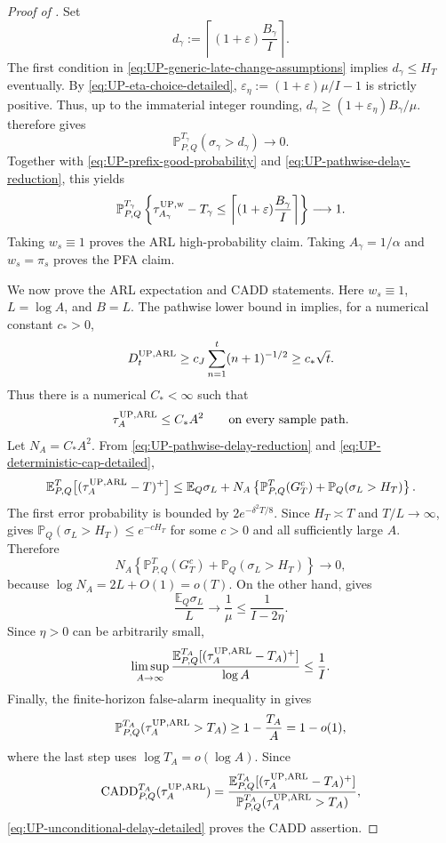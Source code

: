 \documentclass[12pt]{article}
\theoremstyle{spaced}
\theoremstyle{remark}
\newcommand{\E}{\mathbb E}
\newcommand{\bbP}{\mathbb P}
\newcommand{\CADD}{\mathrm{CADD}}
\begin{document}
\begin{proof}[Proof of ]
Set
\[
 d_\gamma
 :=\left\lceil(1+\varepsilon)\frac{B_\gamma}{I}\right\rceil.
\]
The first condition in
\eqref{eq:UP-generic-late-change-assumptions} implies
$d_\gamma\le H_T$ eventually.  By \eqref{eq:UP-eta-choice-detailed},
$\varepsilon_\eta:=(1+\varepsilon)\mu/I-1$ is strictly positive.
Thus, up to the immaterial integer rounding,
$d_\gamma\ge(1+\varepsilon_\eta)B_\gamma/\mu$.
 therefore gives
\[
 \bbP_{P,Q}^{T_\gamma}(\sigma_\gamma>d_\gamma)\to0.
\]
Together with \eqref{eq:UP-prefix-good-probability} and
\eqref{eq:UP-pathwise-delay-reduction}, this yields
\begin{equation}
\label{eq:UP-generic-high-probability-delay}
 \bbP_{P,Q}^{T_\gamma}
 \left\{
   \tau_{A_\gamma}^{\rm UP,w}-T_\gamma
   \le
   \left\lceil(1+\varepsilon)\frac{B_\gamma}{I}\right\rceil
 \right\}
 \longrightarrow1.
\end{equation}
Taking $w_s\equiv1$ proves the ARL high-probability claim.  Taking
$A_\gamma=1/\alpha$ and $w_s=\pi_s$ proves the PFA claim.

We now prove the ARL expectation and CADD statements.  Here $w_s\equiv1$,
$L=\log A$, and $B=L$.  The pathwise lower bound in
 implies, for a numerical constant $c_*>0$,
\[
 D_t^{\rm UP,ARL}
 \ge c_J\sum_{n=1}^t(n+1)^{-1/2}
 \ge c_*\sqrt t.
\]
Thus there is a numerical $C_*<\infty$ such that
\begin{equation}
\label{eq:UP-deterministic-cap-detailed}
 \tau_A^{\rm UP,ARL}\le C_*A^2
 \qquad\text{on every sample path.}
\end{equation}
Let $N_A=C_*A^2$.  From
\eqref{eq:UP-pathwise-delay-reduction} and
\eqref{eq:UP-deterministic-cap-detailed},
\begin{equation}
\label{eq:UP-expectation-decomposition-detailed}
 \E_{P,Q}^{T}\big[(\tau_A^{\rm UP,ARL}-T)^+\big]
 \le
 \E_Q\sigma_L
 +N_A\left\{
   \bbP_{P,Q}^{T}(G_T^c)+\bbP_Q(\sigma_L>H_T)
 \right\}.
\end{equation}
The first error probability is bounded by
$2e^{-\delta^2T/8}$.  Since $H_T\asymp T$ and $T/L\to\infty$,
 gives
$\bbP_Q(\sigma_L>H_T)\le e^{-cH_T}$ for some $c>0$ and all sufficiently
large $A$.  Therefore
\[
 N_A\left\{
   \bbP_{P,Q}^{T}(G_T^c)+\bbP_Q(\sigma_L>H_T)
 \right\}
 \longrightarrow0,
\]
because $\log N_A=2L+O(1)=o(T)$.  On the other hand,
 gives
\[
 \frac{\E_Q\sigma_L}{L}\longrightarrow\frac1\mu
 \le\frac1{I-2\eta}.
\]
Since $\eta>0$ can be arbitrarily small,
\begin{equation}
\label{eq:UP-unconditional-delay-detailed}
 \limsup_{A\to\infty}
 \frac{
   \E_{P,Q}^{T_A}[(\tau_A^{\rm UP,ARL}-T_A)^+]
 }{\log A}
 \le\frac1I.
\end{equation}
Finally, the finite-horizon false-alarm inequality in
 gives
\[
 \bbP_{P,Q}^{T_A}(\tau_A^{\rm UP,ARL}>T_A)
 \ge1-\frac{T_A}{A}=1-o(1),
\]
where the last step uses $\log T_A=o(\log A)$.  Since
\[
 \CADD_{P,Q}^{T_A}(\tau_A^{\rm UP,ARL})
 =
 \frac{
   \E_{P,Q}^{T_A}[(\tau_A^{\rm UP,ARL}-T_A)^+]
 }{
   \bbP_{P,Q}^{T_A}(\tau_A^{\rm UP,ARL}>T_A)
 },
\]
\eqref{eq:UP-unconditional-delay-detailed} proves the CADD assertion.


\end{proof}
\end{document}
